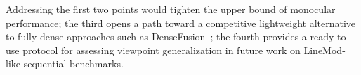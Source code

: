 Addressing the first two points would tighten the upper bound of monocular performance; the third opens a path toward a competitive lightweight alternative to fully dense approaches such as DenseFusion~\cite{wang2019densefusion}; the fourth provides a ready-to-use protocol for assessing viewpoint generalization in future work on LineMod-like sequential benchmarks.
